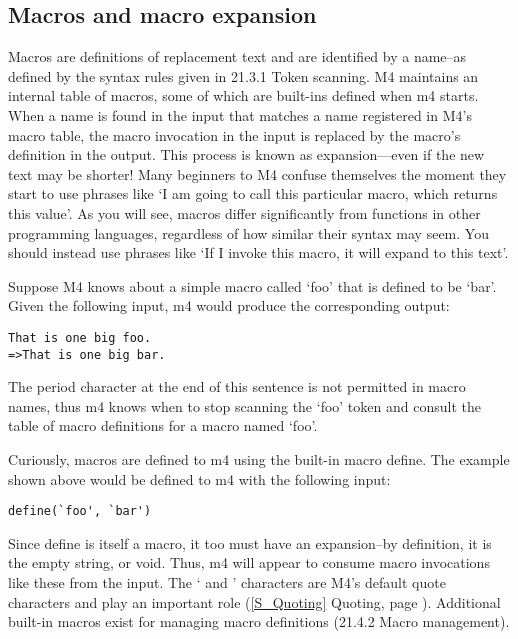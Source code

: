 \subsection{Macros and macro expansion}\label{S_Macros_and_macro_expansion}

Macros are definitions of replacement text and are identified by a name--as defined by the syntax rules given in 21.3.1 Token scanning. M4 maintains an internal table of macros, some of which are built-ins defined when m4 starts. When a name is found in the input that matches a name registered in M4's macro table, the macro invocation in the input is replaced by the macro's definition in the output. This process is known as expansion---even if the new text may be shorter! Many beginners to M4 confuse themselves the moment they start to use phrases like `I am going to call this particular macro, which returns this value'. As you will see, macros differ significantly from functions in other programming languages, regardless of how similar their syntax may seem. You should instead use phrases like `If I invoke this macro, it will expand to this text'.

Suppose M4 knows about a simple macro called `foo' that is defined to be `bar'. Given the following input, m4 would produce the corresponding output: 

\begin{verbatim}
That is one big foo.
=>That is one big bar.
\end{verbatim}

The period character at the end of this sentence is not permitted in macro names, thus m4 knows when to stop scanning the `foo' token and consult the table of macro definitions for a macro named `foo'.

Curiously, macros are defined to m4 using the built-in macro define. The example shown above would be defined to m4 with the following input:

 	
\begin{verbatim}
define(`foo', `bar')
\end{verbatim}

Since define is itself a macro, it too must have an expansion--by definition,
it is the empty string, or void. Thus, m4 will appear to consume macro 
invocations like these from the input. The ` and ' characters are M4's default 
quote characters and play an important role (\ref{S_Quoting} Quoting,
page \pageref{S_Quoting}). Additional built-in macros exist for managing macro 
definitions (21.4.2 Macro management).

